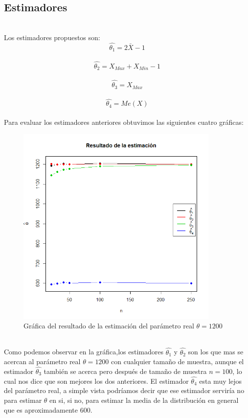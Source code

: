 \documentclass[letterpaper,12pt,onecolumn,titlepage]{article}
\begin{document}
\subsection{Estimadores}
~\\ Los estimadores propuestos son:
~\ $$\hat{\theta_1}=2\bar{X}-1$$
~\ $$\hat{\theta_2}=X_{Max}+X_{Min}-1$$
~\ $$\hat{\theta_3}=X_{Max}$$
~\ $$\hat{\theta_4}=Me(X) $$
~\\ Para evaluar los estimadores anteriores obtuvimos las siguientes cuatro gr\'{a}ficas:
\begin{figure}[!h]
    \begin{center}
        \includegraphics[width=10cm]{Figuras/A.png}
        \caption{Gr\'{a}fica del resultado de la estimaci\'{o}n del par\'{a}metro real $\theta=1200$}
        \label{fig:Densidad}
    \end{center}
\end{figure}
~\\ Como podemos observar en la gr\'{a}fica,los estimadores $\hat{\theta_1}$ y $\hat{\theta_2}$ son los que mas se acercan al par\'{a}metro real $\theta=1200$  con cualquier tama\~{n}o de muestra, aunque el estimador $\hat{\theta_3}$ tambi\'{e}n se acerca pero despu\'{e}s de tama\~{n}o de muestra $n=100$, lo cual nos dice que son mejores los dos anteriores. El estimador $\hat{\theta_4}$ esta muy lejos del par\'{a}metro real, a simple vista podr\'{i}amos decir que ese estimador servir\'{i}a no para estimar $\theta$ en si, si no, para estimar la media de la distribuci\'{o}n en general que es aproximadamente 600.
\end{document}
